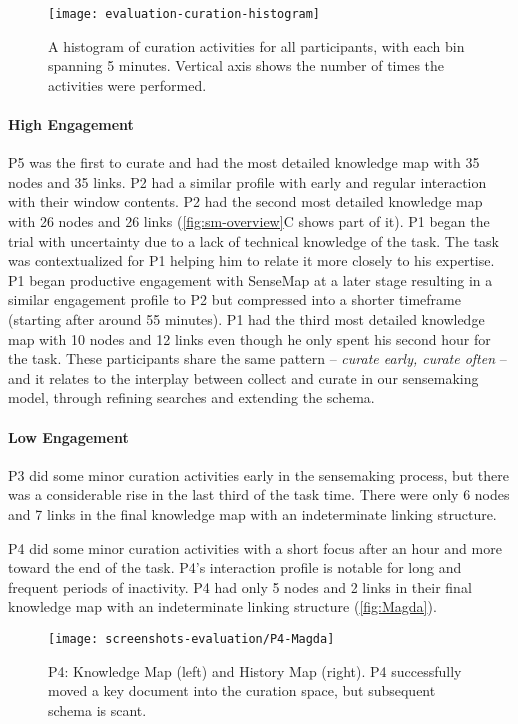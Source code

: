 \begin{figure}[!htb]
	\centering
	\texttt{[image: evaluation-curation-histogram]}
	\caption{A histogram of curation activities for all participants, with each bin spanning  5 minutes. Vertical axis shows the number of times the activities were performed.}
	\label{fig:evaluation-curation-histogram}
\end{figure}

\paragraph{High Engagement}
P5 was the first to curate and had the most detailed knowledge map with 35 nodes and 35 links. P2 had a similar profile with early and regular interaction with their window contents. P2 had the second most detailed knowledge map with 26 nodes and 26 links (\autoref{fig:sm-overview}C shows part of it). P1 began the trial with uncertainty due to a lack of technical knowledge of the task. The task was contextualized for P1 helping him to relate it more closely to his expertise. P1 began productive engagement with SenseMap at a later stage resulting in a similar engagement profile to P2 but compressed into a shorter timeframe (starting after around 55 minutes). P1 had the third most detailed knowledge map with 10 nodes and 12 links even though he only spent his second hour for the task. These participants share the same pattern --  \textit{curate early, curate often} -- and it relates to the interplay between collect and curate in our sensemaking model, through refining searches and extending the schema.

\paragraph{Low Engagement}
P3 did some minor curation activities early in the sensemaking process, but there was a considerable rise in the last third of the task time. There were only 6 nodes and 7 links in the final knowledge map with an indeterminate linking structure.

P4 did some minor curation activities with a short focus after an hour and more toward the end of the task. P4's interaction profile is notable for long and frequent periods of inactivity. P4 had only 5 nodes and 2 links in their final knowledge map with an indeterminate linking structure (\autoref{fig:Magda}).

\begin{figure}[!htb]
	\centering
	\texttt{[image: screenshots-evaluation/P4-Magda]}
	\caption{P4: Knowledge Map (left) and History Map (right). P4 successfully moved a key document into the curation space, but subsequent schema is scant.}
	\label{fig:Magda}
\end{figure}

